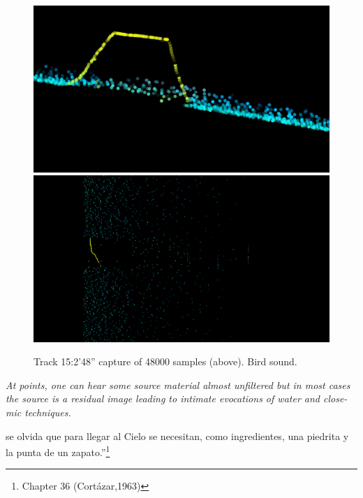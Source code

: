 \documentclass{article}
\begin{document}
\bigskip

\begin{figure}
\begin{multicols}{2}
    \includegraphics[width=\linewidth]{preset-31-elsa-7100000.jpg}%
    \includegraphics[width=\linewidth]{preset-56-elsa-7300000.jpg}%
\end{multicols}
\caption{Track 15:2'48'' capture of 48000 samples (above). Bird sound.}
\end{figure}


\bigskip

\textit{
At points, one can hear some source material almost unfiltered but in most cases the source is a residual image leading to intimate evocations of water and close-mic techniques. }


\bigskip

se olvida que para llegar al Cielo se necesitan, como ingredientes, una piedrita y la punta de un zapato.''\footnote{Chapter 36 (Cort\'{a}zar,1963)}
\end{document}
